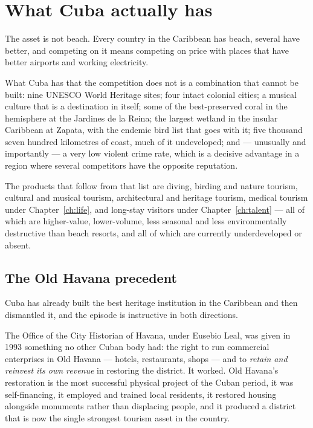 \section{What Cuba actually has}

The asset is not beach. Every country in the Caribbean has beach, several have
better, and competing on it means competing on price with places that have
better airports and working electricity.

What Cuba has that the competition does not is a combination that cannot be
built: nine UNESCO World Heritage sites; four intact colonial cities; a musical
culture that is a destination in itself; some of the best-preserved coral in the
hemisphere at the Jardines de la Reina; the largest wetland in the insular
Caribbean at Zapata, with the endemic bird list that goes with it; five thousand
seven hundred kilometres of coast, much of it undeveloped; and --- unusually and
importantly --- a very low violent crime rate, which is a decisive advantage in a
region where several competitors have the opposite reputation.

The products that follow from that list are diving, birding and nature tourism,
cultural and musical tourism, architectural and heritage tourism, medical
tourism under Chapter~\ref{ch:life}, and long-stay visitors under
Chapter~\ref{ch:talent} --- all of which are higher-value, lower-volume, less
seasonal and less environmentally destructive than beach resorts, and all of
which are currently underdeveloped or absent.

\subsection{The Old Havana precedent}

Cuba has already built the best heritage institution in the Caribbean and then
dismantled it, and the episode is instructive in both directions.

The Office of the City Historian of Havana, under Eusebio Leal, was given in 1993
something no other Cuban body had: the right to run commercial enterprises in
Old Havana --- hotels, restaurants, shops --- and to \emph{retain and reinvest its
own revenue} in restoring the district. It worked. Old Havana's restoration is
the most successful physical project of the Cuban period, it was self-financing,
it employed and trained local residents, it restored housing alongside monuments
rather than displacing people, and it produced a district that is now the single
strongest tourism asset in the country.

